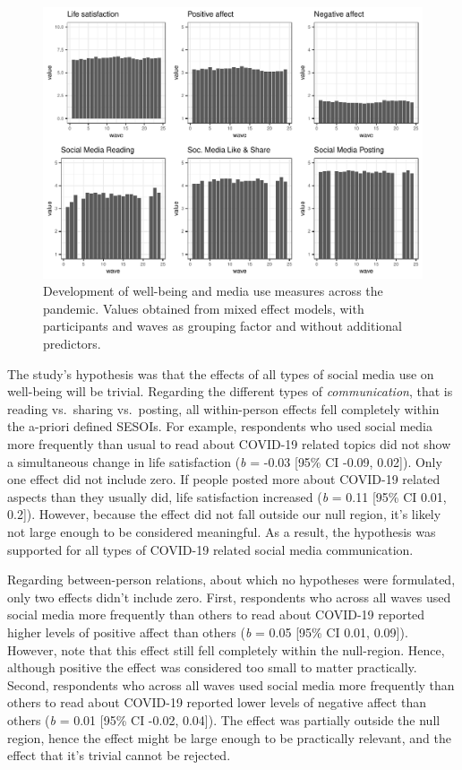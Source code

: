 \documentclass[
  english,
  man,mask,floatsintext]{apa6}
\begin{document}
\begin{figure}[!h]
\includegraphics[width=\textwidth]{figures/fig_descriptives} \caption{Development of well-being and media use measures across the pandemic. Values obtained from mixed effect models, with participants and waves as grouping factor and without additional predictors.}\label{fig:fig-desc}
\end{figure}

The study's hypothesis was that the effects of all types of social media use on well-being will be trivial.
Regarding the different types of \emph{communication}, that is reading vs.~sharing vs.~posting, all within-person effects fell completely within the a-priori defined SESOIs.
For example, respondents who used social media more frequently than usual to read about COVID-19 related topics did not show a simultaneous change in life satisfaction (\emph{b} = -0.03 {[}95\% CI -0.09, 0.02{]}).
Only one effect did not include zero.
If people posted more about COVID-19 related aspects than they usually did, life satisfaction increased (\emph{b} = 0.11 {[}95\% CI 0.01, 0.2{]}).
However, because the effect did not fall outside our null region, it's likely not large enough to be considered meaningful.
As a result, the hypothesis was supported for all types of COVID-19 related social media communication.

Regarding between-person relations, about which no hypotheses were formulated, only two effects didn't include zero.
First, respondents who across all waves used social media more frequently than others to read about COVID-19 reported higher levels of positive affect than others (\emph{b} = 0.05 {[}95\% CI 0.01, 0.09{]}).
However, note that this effect still fell completely within the null-region.
Hence, although positive the effect was considered too small to matter practically.
Second, respondents who across all waves used social media more frequently than others to read about COVID-19 reported lower levels of negative affect than others (\emph{b} = 0.01 {[}95\% CI -0.02, 0.04{]}).
The effect was partially outside the null region, hence the effect might be large enough to be practically relevant, and the effect that it's trivial cannot be rejected.
\end{document}
